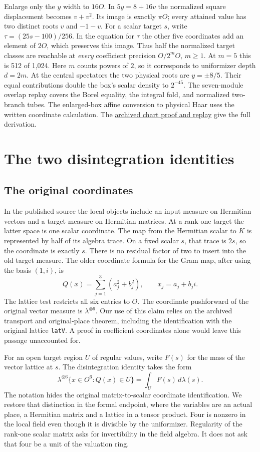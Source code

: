 \documentclass[12pt,letterpaper]{article}
\newcommand{\id}[1]{{\small\nolinkurl{#1}}}
\begin{document}
Enlarge only the $y$ width to $16O$. In $5y=8+16v$ the normalized square displacement becomes $v+v^2$. Its image is exactly $\pi O$; every attained value has two distinct roots $v$ and $-1-v$. For a scalar target $s$, write $\tau=(25s-100)/256$. In the equation for $\tau$ the other five coordinates add an element of $2O$, which preserves this image. Thus half the normalized target classes are reachable at \emph{every} coefficient precision $O/2^mO$, $m\ge1$. At $m=5$ this is 512 of 1,024. Here $m$ counts powers of $2$, so it corresponds to uniformizer depth $d=2m$. At the central spectators the two physical roots are $y=\pm8/5$. Their equal contributions double the box's scalar density to $2^{-45}$. The seven-module overlap replay covers the Borel equality, the integral fold, and normalized two-branch tubes. The enlarged-box affine conversion to physical Haar uses the written coordinate calculation. The \href{https://github.com/nousentllc/riemann-hypothesis/tree/a4cdffe5be81baa134fc9c82219481e0070fc09c/research/uriel/experiments/target-four-chart-overlap}{archived chart proof and replay} give the full derivation.

\section{The two disintegration identities}
\subsection{The original coordinates}
In the published source the local objects include an input measure on Hermitian vectors and a target measure on Hermitian matrices. At a rank-one target the latter space is one scalar coordinate. The map from the Hermitian scalar to $K$ is represented by half of its algebra trace. On a fixed scalar $s$, that trace is $2s$, so the coordinate is exactly $s$. There is no residual factor of two to insert into the old target measure. The older coordinate formula for the Gram map, after using the basis $(1,i)$, is
\[
 Q(x)=\sum_{j=1}^3(a_j^2+b_j^2),\qquad x_j=a_j+b_j i .
\]
The lattice test restricts all six entries to $O$. The coordinate pushforward of the original vector measure is $\lambda^{\otimes6}$. Our use of this claim relies on the archived transport and original-place theorem, including the identification with the original lattice \id{latV}. A proof in coefficient coordinates alone would leave this passage unaccounted for.

For an open target region $U$ of regular values, write $F(s)$ for the mass of the vector lattice at $s$. The disintegration identity takes the form
\[
    \lambda^{\otimes6}\{x\in O^6:Q(x)\in U\}=\int_U F(s)\,d\lambda(s).
\]
The notation hides the original matrix-to-scalar coordinate identification. We restore that distinction in the formal endpoint, where the variables are an actual place, a Hermitian matrix and a lattice in a tensor product. Four is nonzero in the local field even though it is divisible by the uniformizer. Regularity of the rank-one scalar matrix asks for invertibility in the field algebra. It does not ask that four be a unit of the valuation ring.
\end{document}

